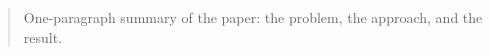 \begin{abstract}
    One-paragraph summary of the paper: the problem, the approach, and the result.
\end{abstract}
